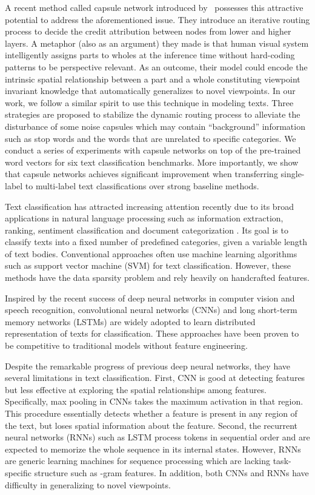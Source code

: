 \documentclass[11pt]{article}
\begin{document}
A recent method called capsule network introduced by~ possesses this attractive potential
to address the aforementioned issue. They introduce an iterative routing process to decide the credit attribution between nodes 
from lower and higher layers. A metaphor (also as an argument) they made is that human visual system intelligently assigns 
parts to wholes at the inference time without hard-coding patterns to be perspective relevant. As an outcome,
their model could encode the intrinsic spatial relationship between a part and a whole constituting viewpoint
invariant knowledge that automatically generalizes to novel viewpoints. 
In our work, we follow a similar spirit
to use this technique in modeling texts. 
Three strategies are proposed to stabilize the dynamic routing process to alleviate the disturbance of some noise capsules which may contain ``background'' information such as stop words and the words that are unrelated to specific categories.
We conduct a series of experiments with capsule networks on  top of the pre-trained word vectors for six text classification benchmarks. More importantly, we show that capsule networks 
achieves significant improvement when transferring single-label to multi-label text classifications over strong baseline methods.

\iffalse
Text classification has attracted increasing attention recently due to its broad applications in natural language processing such as information extraction, ranking, sentiment classification and document categorization \cite{allahyari2017brief}. Its goal is to classify texts into a fixed number of predefined categories, given a variable length of text bodies. Conventional approaches 
often use machine learning algorithms such as support vector machine (SVM) \cite{joachims1998text} for text classification. However, these methods have the data sparsity problem and rely heavily on handcrafted features.

Inspired by the recent success of deep neural networks in computer vision and speech recognition, convolutional neural networks (CNNs) and long short-term memory networks (LSTMs) are widely adopted to learn distributed representation of texts for classification. These approaches have been proven to be competitive to traditional models without feature engineering.

Despite the remarkable progress of previous deep neural networks, they have several limitations in text classification. 
First, CNN is good at detecting features but less effective at exploring the spatial relationships among features. Specifically, max pooling in CNNs takes the maximum activation in that region. This procedure essentially detects whether a feature is present in any region of the text, but loses spatial information about the feature. Second, the recurrent neural networks (RNNs) such as LSTM process tokens in sequential order and are expected to memorize the whole sequence in its internal states. However, RNNs are generic learning machines for sequence processing which are lacking task-specific structure such as -gram features. In addition, both CNNs and RNNs have difficulty in generalizing to novel viewpoints. 
\end{document}

